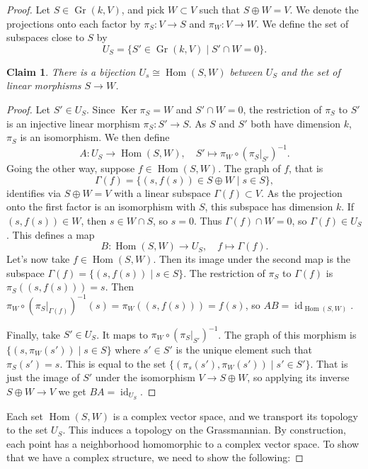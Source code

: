 \documentclass[11pt]{article}
\newtheorem*{claim}{Claim}
\newtheorem*{proof}{Proof}
\DeclareMathOperator{\Gr}{Gr}
\DeclareMathOperator{\Ker}{Ker}
\DeclareMathOperator{\Hom}{Hom}
\DeclareMathOperator{\id}{id}
\begin{document}
\begin{proof}
Let $S \in \Gr(k, V)$, and pick $W \subset V$ such that $S \oplus W = V$. We denote the projections onto each factor by $\pi_S : V \to S$ and $\pi_W : V \to W$. We define the set of subspaces close to $S$ by
$$
U_S =
\{
S' \in \Gr(k, V)
\mid
S' \cap W = 0
\}.
$$

\begin{claim}
There is a bijection $U_s \cong \Hom(S, W)$ between $U_S$ and the set of linear morphisms $S \to W$.
\end{claim}

\begin{proof}
Let $S' \in U_S$. Since $\Ker \pi_S = W$ and $S' \cap W = 0$, the restriction of $\pi_S$ to $S'$ is an injective linear morphism $\pi_S : S' \to S$. As $S$ and $S'$ both have dimension $k$, $\pi_S$ is an isomorphism. We then define
$$
A: U_S \to \Hom(S, W),
\quad
S' \mapsto \pi_W \circ (\pi_S|_{S'})^{-1}.
$$
Going the other way, suppose $f \in \Hom(S, W)$. The graph of $f$, that is
$$
\Gamma(f) = \{ (s, f(s)) \in S \oplus W \mid s \in S \},
$$
identifies via $S \oplus W = V$ with a linear subspace $\Gamma(f) \subset V$. As the projection onto the first factor is an isomorphism with $S$, this subspace has dimension $k$. If $(s, f(s)) \in W$, then $s \in W \cap S$, so $s = 0$. Thus $\Gamma(f) \cap W = 0$, so $\Gamma(f) \in U_S$. This defines a map
$$
B: \Hom(S, W) \to U_S,
\quad
f \mapsto \Gamma(f).
$$
Let's now take $f \in \Hom(S, W)$. Then its image under the second map is the subspace $\Gamma(f) = \{(s, f(s)) \mid s \in S\}$. The restriction of $\pi_S$ to $\Gamma(f)$ is $\pi_S((s, f(s))) = s$. Then $\pi_W \circ (\pi_S|_{\Gamma(f)})^{-1}(s) = \pi_W((s, f(s))) = f(s)$, so $AB = \id_{\Hom(S, W)}$.

Finally, take $S' \in U_S$. It maps to $\pi_W \circ (\pi_S|_{S'})^{-1}$. The graph of this morphism is $\{(s, \pi_W(s')) \mid s \in S\}$ where $s' \in S'$ is the unique element such that $\pi_S(s') = s$. This is equal to the set $\{(\pi_s(s'), \pi_W(s')) \mid s' \in S'\}$. That is just the image of $S'$ under the isomorphism $V \to S \oplus W$, so applying its inverse $S \oplus W \to V$ we get $BA = \id_{U_S}$.
\end{proof}

Each set $\Hom(S, W)$ is a complex vector space, and we transport its topology to the set $U_S$. This induces a topology on the Grassmannian. By construction, each point has a neighborhood homomorphic to a complex vector space. To show that we have a complex structure, we need to show the following:



\end{proof}
\end{document}
